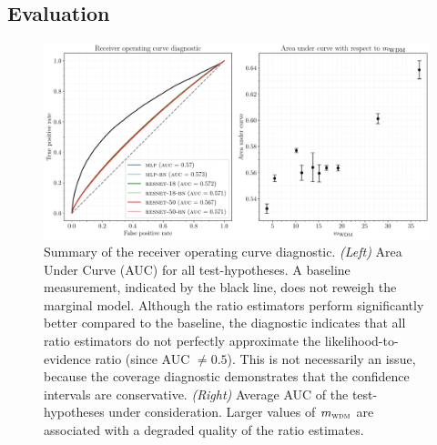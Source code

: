 \documentclass[fleqn,usenatbib]{mnras}
\begin{document}
\subsection{Evaluation}
\label{sec:evaluation}
\begin{figure}
  \centering
  \includegraphics[width=\linewidth]{figures/roc}
  \caption{Summary of the receiver operating curve diagnostic.
\emph{(Left)} Area Under Curve (AUC) for all test-hypotheses. A baseline measurement, indicated by the black line, does
not reweigh the marginal model. Although the ratio estimators perform significantly better compared to the baseline, the diagnostic indicates that all ratio estimators do not perfectly approximate the
likelihood-to-evidence ratio (since AUC $\neq0.5$).
This is not necessarily an issue, because the coverage diagnostic demonstrates that the
confidence intervals are conservative. \emph{(Right)} Average AUC of the test-hypotheses under consideration. Larger values of $m_\textsc{wdm}$ are associated with a degraded quality of the ratio estimates.
    ~~\protect{}}
  \label{fig:roc_diagnostic}
\end{figure}
\end{document}
